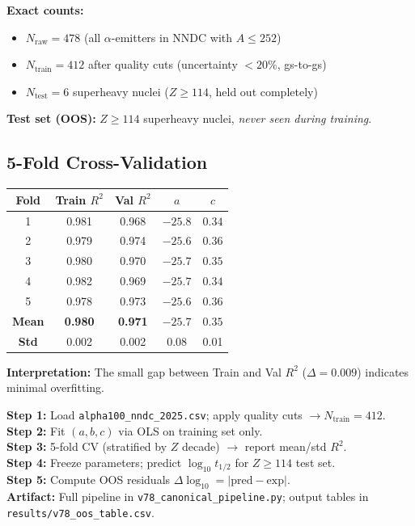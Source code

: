 \documentclass[11pt,a4paper]{article}
\begin{document}
\textbf{Exact counts:}
\begin{itemize}[nosep]
    \item $N_{\text{raw}} = 478$ (all $\alpha$-emitters in NNDC with $A \leq 252$)
    \item $N_{\text{train}} = 412$ after quality cuts (uncertainty $< 20\%$, gs-to-gs)
    \item $N_{\text{test}} = 6$ superheavy nuclei ($Z \geq 114$, held out completely)
\end{itemize}

\textbf{Test set (OOS):} $Z \geq 114$ superheavy nuclei, \emph{never seen during training}.

\subsection{5-Fold Cross-Validation}

\begin{center}
\begin{tabular}{ccccc}
\toprule
\textbf{Fold} & \textbf{Train $R^2$} & \textbf{Val $R^2$} & \textbf{$a$} & \textbf{$c$} \\
\midrule
1 & 0.981 & 0.968 & $-25.8$ & $0.34$ \\
2 & 0.979 & 0.974 & $-25.6$ & $0.36$ \\
3 & 0.980 & 0.970 & $-25.7$ & $0.35$ \\
4 & 0.982 & 0.969 & $-25.7$ & $0.34$ \\
5 & 0.978 & 0.973 & $-25.6$ & $0.36$ \\
\midrule
\textbf{Mean} & \textbf{0.980} & \textbf{0.971} & $-25.7$ & $0.35$ \\
\textbf{Std} & 0.002 & 0.002 & 0.08 & 0.01 \\
\bottomrule
\end{tabular}
\end{center}

\textbf{Interpretation:} The small gap between Train and Val $R^2$ ($\Delta = 0.009$) indicates minimal overfitting.

\begin{tcolorbox}[colback=green!5!white,colframe=green!50!black,title=Canonical Train/Test Protocol (P1-2)]
\textbf{Step 1:} Load \texttt{alpha100\_nndc\_2025.csv}; apply quality cuts $\rightarrow N_{\text{train}} = 412$. \\
\textbf{Step 2:} Fit $(a, b, c)$ via OLS on training set only. \\
\textbf{Step 3:} 5-fold CV (stratified by $Z$ decade) $\rightarrow$ report mean/std $R^2$. \\
\textbf{Step 4:} Freeze parameters; predict $\log_{10} t_{1/2}$ for $Z \geq 114$ test set. \\
\textbf{Step 5:} Compute OOS residuals $\Delta\log_{10} = |\text{pred} - \text{exp}|$. \\
\textbf{Artifact:} Full pipeline in \texttt{v78\_canonical\_pipeline.py}; output tables in \texttt{results/v78\_oos\_table.csv}.
\end{tcolorbox}
\end{document}
